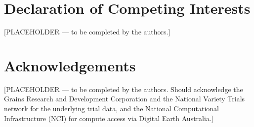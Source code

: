 \section*{Declaration of Competing Interests}\label{declaration-of-competing-interests}

{[}PLACEHOLDER --- to be completed by the authors.{]}

\section*{Acknowledgements}\label{acknowledgements}

{[}PLACEHOLDER --- to be completed by the authors. Should acknowledge the Grains Research and Development Corporation and the National Variety Trials network for the underlying trial data, and the National Computational Infrastructure (NCI) for compute access via Digital Earth Australia.{]}
